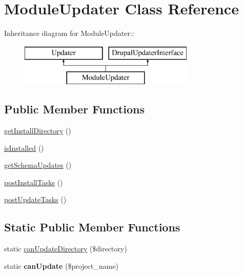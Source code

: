 \hypertarget{classModuleUpdater}{
\section{ModuleUpdater Class Reference}
\label{classModuleUpdater}
}
Inheritance diagram for ModuleUpdater::\begin{figure}[H]
\begin{center}
\leavevmode
\includegraphics[height=2cm]{classModuleUpdater}
\end{center}
\end{figure}
\subsection*{Public Member Functions}
\begin{DoxyCompactItemize}
\item 
\hyperlink{classModuleUpdater_a8c7efff0795d79e256cab15be533800d}{getInstallDirectory} ()
\item 
\hyperlink{classModuleUpdater_af9033e41acac0be1e70097ca3303b1ed}{isInstalled} ()
\item 
\hyperlink{classModuleUpdater_a99410051ca3d8785ef39a9cf543c18b0}{getSchemaUpdates} ()
\item 
\hyperlink{classModuleUpdater_aca197ac3c04662e4c56c26e839fe01d7}{postInstallTasks} ()
\item 
\hyperlink{classModuleUpdater_a120524659a6f049fd27dbf487a61af0e}{postUpdateTasks} ()
\end{DoxyCompactItemize}
\subsection*{Static Public Member Functions}
\begin{DoxyCompactItemize}
\item 
static \hyperlink{classModuleUpdater_a7bd09734a00297f3c1802d8eece33ed7}{canUpdateDirectory} (\$directory)
\item 
\hypertarget{classModuleUpdater_a4feb70245874459a10918c35548fad67}{
static {\bfseries canUpdate} (\$project\_\-name)}
\label{classModuleUpdater_a4feb70245874459a10918c35548fad67}

\end{DoxyCompactItemize}


